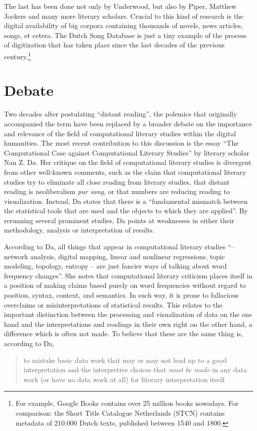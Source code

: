 The last has been done not only by Underwood, but also by Piper, Matthew Jockers and many more literary scholars. Crucial to this kind of research is the digital availability of big corpora containing thousands of novels, news articles, songs, et cetera. The Dutch Song Database is just a tiny example of the process of digitization that has taken place since the last decades of the previous century.\footnote{For example, Google Books contains over 25 million books nowadays. For comparison: the Short Title Catalogue Netherlands (STCN) contains metadata of 210.000 Dutch texts, published between 1540 and 1800.}

\section{Debate}
Two decades after postulating \enquote{distant reading}, the polemics that originally accompanied the term have been replaced by a broader debate on the importance and relevance of the field of computational literary studies within the digital humanities. The most recent contribution to this discussion is the essay \enquote{The Computational Case against Computational Literary Studies} by literary scholar Nan Z. Da. Her critique on the field of computational literary studies is divergent from other well-known comments, such as the claim that computational literary studies try to eliminate all close reading from literary studies\autocite[109]{north_literary_2017}, that distant reading is neoliberalism \textit{pur sang}\autocite{allington_neoliberal_nodate}, or that numbers are reducing reading to visualization.\autocite{underwood_it_2017} Instead, Da states that there is a \enquote{fundamental mismatch between the statistical tools that are used and the objects to which they are applied}.\autocite[601]{da_computational_2019} By rerunning several prominent studies, Da points at weaknesses in either their methodology, analysis or interpretation of results.

According to Da, all things that appear in computational literary studies \enquote{-- network analysis, digital mapping, linear and nonlinear regressions, topic modeling, topology, entropy -- are just fancier ways of talking about word frequency changes}.\autocite[607]{da_computational_2019} She notes that computational literary criticism places itself in a position of making claims based purely on word frequencies without regard to position, syntax, context, and semantics. In such way, it is prone to fallacious overclaims or misinterpretations of statistical results.\autocite[611]{da_computational_2019} This relates to the important distinction between the processing and visualization of data on the one hand and the interpretations and readings in their own right on the other hand, a difference which is often not made. To believe that these are the same thing is, according to Da,
\begin{quote}
	to mistake basic data work that may or may not lead up to a good interpretation and the interpretive choices that \textit{must be made} in any data work (or have no data work at all) for literary interpretation itself.\autocite[606]{da_computational_2019}
\end{quote}

